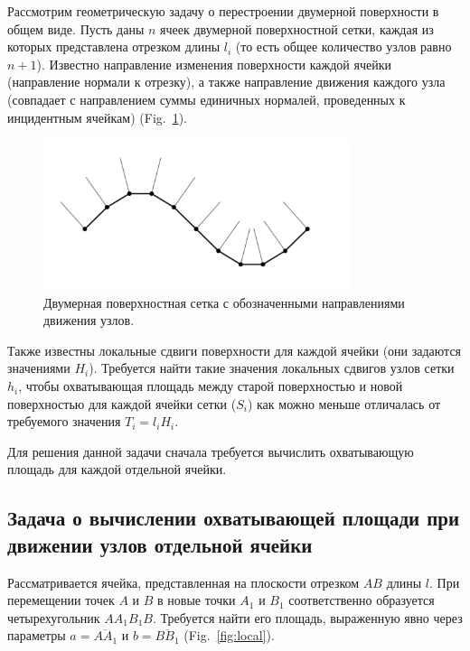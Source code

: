 \documentclass[
11pt,%
tightenlines,%
twoside,%
onecolumn,%
nofloats,%
nobibnotes,%
nofootinbib,%
superscriptaddress,%
noshowpacs,%
centertags]%
{revtex4}
\begin{document}
Рассмотрим геометрическую задачу о перестроении двумерной поверхности в общем виде.
Пусть даны $n$ ячеек двумерной поверхностной сетки, каждая из которых представлена отрезком длины $l_i$ (то есть общее количество узлов равно $n + 1$).
Известно направление изменения поверхности каждой ячейки (направление нормали к отрезку), а также направление движения каждого узла (совпадает с направлением суммы единичных нормалей, проведенных к инцидентным ячейкам) (Fig.~\ref{fig:grid_normals}).

\begin{figure}[h]
\setcaptionmargin{5mm}
\onelinecaptionstrue
\includegraphics[width=0.8\textwidth]{pics/grid_normals.pdf}
\caption{Двумерная поверхностная сетка с обозначенными направлениями движения узлов.}
\label{fig:grid_normals}
\end{figure}

Также известны локальные сдвиги поверхности для каждой ячейки (они задаются значениями $H_i$).
Требуется найти такие значения локальных сдвигов узлов сетки $h_i$, чтобы охватывающая площадь между старой поверхностью и новой поверхностью для каждой ячейки сетки ($S_i$) как можно меньше отличалась от требуемого значения $T_i = l_iH_i$.

Для решения данной задачи сначала требуется вычислить охватывающую площадь для каждой отдельной ячейки.

\subsection{Задача о вычислении охватывающей площади при движении узлов отдельной ячейки}

Рассматривается ячейка, представленная на плоскости отрезком $AB$ длины $l$.
При перемещении точек $A$ и $B$ в новые точки $A_1$ и $B_1$ соответственно образуется четырехугольник $AA_1B_1B$.
Требуется найти его площадь, выраженную явно через параметры $a = \overline{AA_1}$ и $b = \overline{BB_1}$ (Fig.~\ref{fig:local}).
\end{document}
